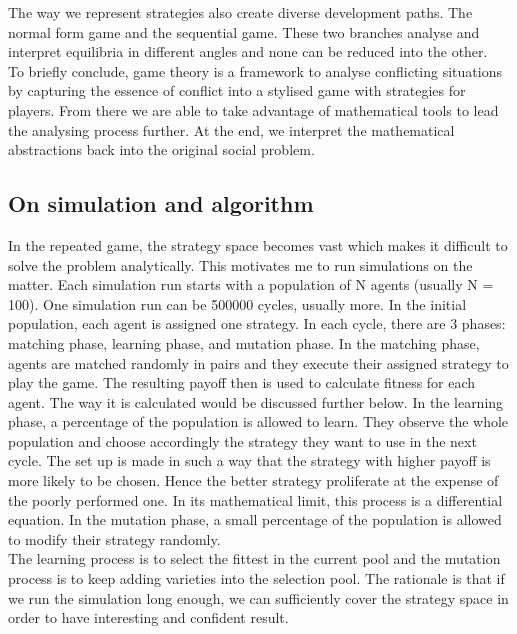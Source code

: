 \documentclass[12.5pt]{report}
\begin{document}
The way we represent strategies also create diverse development paths. The normal form game and the sequential game. These two branches analyse and interpret equilibria in different angles and none can be reduced into the other.\\

To briefly conclude, game theory is a framework to analyse conflicting situations by capturing the essence of conflict into a stylised game with strategies for players. From there we are able to take advantage of mathematical tools to lead the analysing process further. At the end, we interpret the mathematical abstractions back into the original social problem.

\subsection{On simulation and algorithm}
In the repeated game, the strategy space becomes vast which makes it difficult to solve the problem analytically. This motivates me to run simulations on the matter. Each simulation run starts with a population of N agents (usually N = 100). One simulation run can be 500000 cycles, usually more. In the initial population, each agent is assigned one strategy. In each cycle, there are 3 phases: matching phase, learning phase, and mutation phase. In the matching phase, agents are matched randomly in pairs and they execute their assigned strategy to play the game. The resulting payoff then is used to calculate fitness for each agent. The way it is calculated would be discussed further below. In the learning phase, a percentage of the population is allowed to learn. They observe the whole population and choose accordingly the strategy they want to use in the next cycle. The set up is made in such a way that the strategy with higher payoff is more likely to be chosen. Hence the better strategy proliferate at the expense of the poorly performed one. In its mathematical limit, this process is a differential equation. In the mutation phase, a small percentage of the population is allowed to modify their strategy randomly.\\

The learning process is to select the fittest in the current pool and the mutation process is to keep adding varieties into the selection pool. The rationale is that if we run the simulation long enough, we can sufficiently cover the strategy space in order to have interesting and confident result.\\
\end{document}
